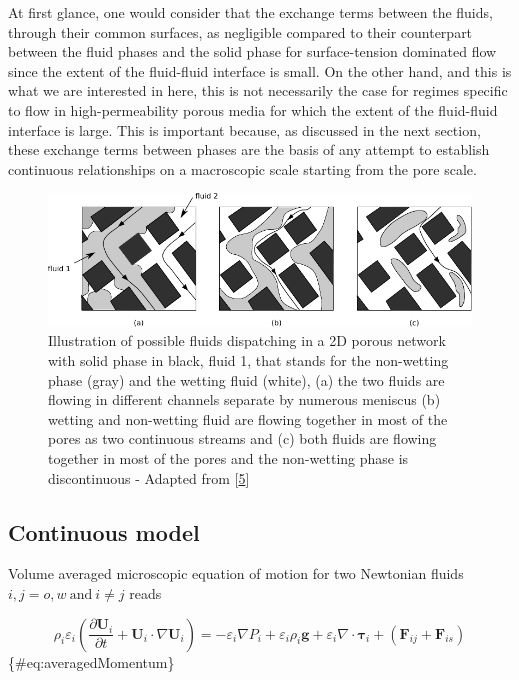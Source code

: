 \documentclass[]{article}
\begin{document}
At first glance, one would consider that the exchange terms between the
fluids, through their common surfaces, as negligible compared to their
counterpart between the fluid phases and the solid phase for
surface-tension dominated flow since the extent of the fluid-fluid
interface is small. On the other hand, and this is what we are
interested in here, this is not necessarily the case for regimes
specific to flow in high-permeability porous media for which the extent
of the fluid-fluid interface is large. This is important because, as
discussed in the next section, these exchange terms between phases are
the basis of any attempt to establish continuous relationships on a
macroscopic scale starting from the pore scale.

\begin{figure}
\hypertarget{fig:fluidPatterns}{%
\centering
\includegraphics{figures/pdf/dessin.pdf}
\caption{Illustration of possible fluids dispatching in a 2D porous
network with solid phase in black, fluid 1, that stands for the
non-wetting phase (gray) and the wetting fluid (white), (a) the two
fluids are flowing in different channels separate by numerous meniscus
(b) wetting and non-wetting fluid are flowing together in most of the
pores as two continuous streams and (c) both fluids are flowing together
in most of the pores and the non-wetting phase is discontinuous -
Adapted from
{[}\protect\hyperlink{ref-dullien2012porous}{5}{]}}\label{fig:fluidPatterns}
}
\end{figure}

\hypertarget{continuous-model}{%
\subsection{Continuous model}\label{continuous-model}}

Volume averaged microscopic equation of motion for two Newtonian fluids
\(i,j=o,w\:\mathrm{and}\:i\neq j\) reads

\[
\rho_{i}\varepsilon_{i}\left(\frac{\partial\mathbf{U}_{i}}{\partial t}+\mathbf{U}_{i}\cdot\nabla\mathbf{U}_{i}\right)=-\varepsilon_{i}\nabla P_{i}+\varepsilon_{i}\rho_{i}\mathbf{g}+\varepsilon_{i}\nabla\cdot\boldsymbol{\tau}_{i}+(\mathbf{F}_{ij}+\mathbf{F}_{is})
\] \{\#eq:averagedMomentum\}
\end{document}
